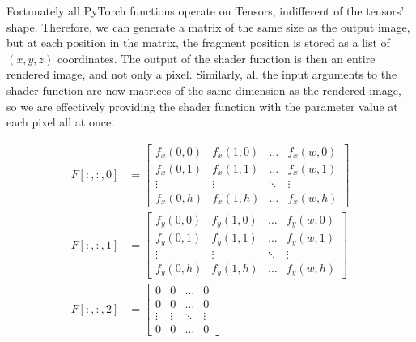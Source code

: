 Fortunately all PyTorch functions operate on Tensors, indifferent of the tensors' shape. Therefore, we can generate a matrix of the same size as the output image, but at each position in the matrix, the fragment position  is stored as a list of $(x,y,z)$ coordinates. The output of the shader function is then an entire rendered image, and not only a pixel. Similarly, all the input arguments to the shader function are now matrices of the same dimension as the rendered image, so we are effectively providing the shader function with the parameter value at each pixel all at once.

\begin{equation}\label{eq:FragPosMatrix}
\begin{aligned}
    F[:,:,0] &= 
    \begin{bmatrix} 
        f_x(0,0)    & f_x(1,0)  & \dots     & f_x(w,0)  \\
        f_x(0,1)    & f_x(1,1)  & \dots     & f_x(w,1)  \\
        \vdots      & \vdots    & \ddots    & \vdots    \\
        f_x(0,h)    & f_x(1,h)  & \dots     & f_x(w,h)  
    \end{bmatrix} \\
    F[:,:,1] &= 
    \begin{bmatrix} 
        f_y(0,0)    & f_y(1,0)  & \dots     & f_y(w,0)  \\
        f_y(0,1)    & f_y(1,1)  & \dots     & f_y(w,1)  \\
        \vdots      & \vdots    & \ddots    & \vdots    \\
        f_y(0,h)    & f_y(1,h)  & \dots     & f_y(w,h)  
    \end{bmatrix} \\
    F[:,:,2] &= 
    \begin{bmatrix} 
        0    & 0  & \dots     & 0  \\
        0    & 0  & \dots     & 0  \\
        \vdots      & \vdots    & \ddots    & \vdots    \\
        0    & 0  & \dots     & 0  
    \end{bmatrix}
\end{aligned}
\end{equation}

